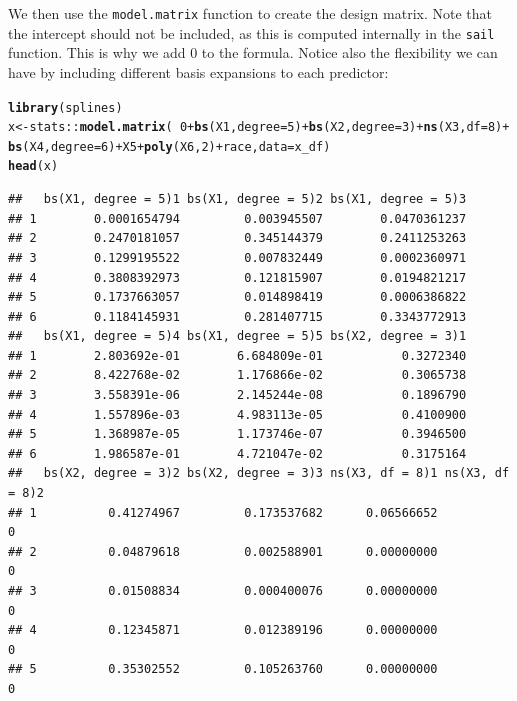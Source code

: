 \documentclass[12pt,letter]{article}\usepackage[]{graphicx}\usepackage[]{color}
\makeatletter
\newcommand{\hlnum}[1]{\textcolor[rgb]{0.686,0.059,0.569}{#1}}%
\newcommand{\hlopt}[1]{\textcolor[rgb]{0,0,0}{#1}}%
\newcommand{\hlstd}[1]{\textcolor[rgb]{0.345,0.345,0.345}{#1}}%
\newcommand{\hlkwb}[1]{\textcolor[rgb]{0.69,0.353,0.396}{#1}}%
\newcommand{\hlkwc}[1]{\textcolor[rgb]{0.333,0.667,0.333}{#1}}%
\newcommand{\hlkwd}[1]{\textcolor[rgb]{0.737,0.353,0.396}{\textbf{#1}}}%
\newenvironment{kframe}{%
 \def\at@end@of@kframe{}%
 \ifinner\ifhmode%
  \def\at@end@of@kframe{\end{minipage}}%
  \begin{minipage}{\columnwidth}%
 \fi\fi%
 \def\FrameCommand##1{\hskip\@totalleftmargin \hskip-\fboxsep
 \colorbox{shadecolor}{##1}\hskip-\fboxsep
     \hskip-\linewidth \hskip-\@totalleftmargin \hskip\columnwidth}%
 \MakeFramed {\advance\hsize-\width
   \@totalleftmargin\z@ \linewidth\hsize
   \@setminipage}}%
 {\par\unskip\endMakeFramed%
 \at@end@of@kframe}
\newenvironment{knitrout}{}{} %
\makeatother
\begin{document}
We then use the \texttt{model.matrix} function to create the design matrix. Note that the intercept should not be included, as this is computed internally in the \texttt{sail} function. This is why we add 0 to the formula. Notice also the flexibility we can have by including different basis expansions to each predictor:

\begin{knitrout}\scriptsize
{}\color{fgcolor}\begin{kframe}
\begin{alltt}
\hlkwd{library}\hlstd{(splines)}
\hlstd{x} \hlkwb{<-} \hlstd{stats}\hlopt{::}\hlkwd{model.matrix}\hlstd{(}\hlopt{~} \hlnum{0} \hlopt{+}  \hlkwd{bs}\hlstd{(X1,} \hlkwc{degree} \hlstd{=} \hlnum{5}\hlstd{)} \hlopt{+} \hlkwd{bs}\hlstd{(X2,} \hlkwc{degree} \hlstd{=} \hlnum{3}\hlstd{)} \hlopt{+} \hlkwd{ns}\hlstd{(X3,} \hlkwc{df} \hlstd{=} \hlnum{8}\hlstd{)} \hlopt{+}
\hlkwd{bs}\hlstd{(X4,} \hlkwc{degree} \hlstd{=} \hlnum{6}\hlstd{)} \hlopt{+} \hlstd{X5} \hlopt{+} \hlkwd{poly}\hlstd{(X6,}\hlnum{2}\hlstd{)} \hlopt{+} \hlstd{race,} \hlkwc{data} \hlstd{= x_df)}
\hlkwd{head}\hlstd{(x)}
\end{alltt}
\begin{verbatim}
##   bs(X1, degree = 5)1 bs(X1, degree = 5)2 bs(X1, degree = 5)3
## 1        0.0001654794         0.003945507        0.0470361237
## 2        0.2470181057         0.345144379        0.2411253263
## 3        0.1299195522         0.007832449        0.0002360971
## 4        0.3808392973         0.121815907        0.0194821217
## 5        0.1737663057         0.014898419        0.0006386822
## 6        0.1184145931         0.281407715        0.3343772913
##   bs(X1, degree = 5)4 bs(X1, degree = 5)5 bs(X2, degree = 3)1
## 1        2.803692e-01        6.684809e-01           0.3272340
## 2        8.422768e-02        1.176866e-02           0.3065738
## 3        3.558391e-06        2.145244e-08           0.1896790
## 4        1.557896e-03        4.983113e-05           0.4100900
## 5        1.368987e-05        1.173746e-07           0.3946500
## 6        1.986587e-01        4.721047e-02           0.3175164
##   bs(X2, degree = 3)2 bs(X2, degree = 3)3 ns(X3, df = 8)1 ns(X3, df = 8)2
## 1          0.41274967         0.173537682      0.06566652               0
## 2          0.04879618         0.002588901      0.00000000               0
## 3          0.01508834         0.000400076      0.00000000               0
## 4          0.12345871         0.012389196      0.00000000               0
## 5          0.35302552         0.105263760      0.00000000               0

\end{verbatim}
\end{kframe}
\end{knitrout}
\end{document}
